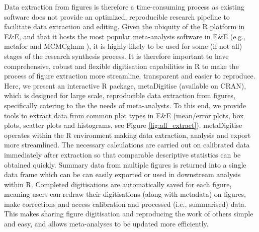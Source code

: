 \documentclass[12pt]{article}
\newcommand{\pkg}[1]{{\fontseries{b}\selectfont #1}}
\let\proglang=\textsf
\begin{document}
Data extraction from figures is therefore a time-consuming process as existing software does not provide an optimized, reproducible research pipeline to facilitate data extraction and editing. Given the ubiquity of the R platform in E\&E, and that it hosts the most popular meta-analysis software in E\&E (e.g., metafor \citep{Viechtbauer2010} and MCMCglmm \citep{Hadfield2010b}), it is highly likely to be used for some (if not all) stages of the research synthesis process. It is therefore important to have comprehensive, robust and flexible digitisation capabilities in R to make the process of figure extraction more streamline, transparent and easier to reproduce. Here, we present an interactive \proglang{R} package, \pkg{metaDigitise} (available on CRAN), which is designed for large scale, reproducible data extraction from figures, specifically catering to the the needs of meta-analysts. To this end, we provide tools to extract data from common plot types in E\&E (mean/error plots, box plots, scatter plots and histograms, see Figure \ref{fig:all_extract}). \pkg{metaDigitise} operates within the \proglang{R} environment making data extraction, analysis and export more streamlined. The necessary calculations are carried out on calibrated data immediately after extraction so that comparable descriptive statistics can be obtained quickly. Summary data from multiple figures is returned into a single data frame which can be can easily exported or used in downstream analysis within \proglang{R}. Completed digitisations are automatically saved for each figure, meaning users can redraw their digitisations (along with metadata) on figures, make corrections and access calibration and processed (i.e., summarised) data. This makes sharing figure digitisation and reproducing the work of others simple and easy, and allows meta-analyses to be updated more efficiently.



\end{document}
